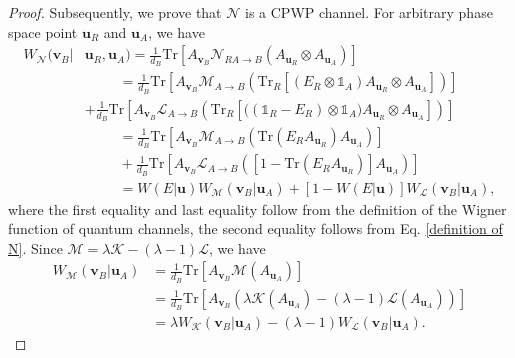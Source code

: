 \documentclass[10pt,a4paper]{amsart}
\begin{document}
\begin{proof}
	Subsequently, we prove that $\mathcal{N}$ is a CPWP channel.
	For arbitrary phase space point $\mathbf{u}_R$ and $\mathbf{u}_A$, we have
	\begin{equation}
		\begin{aligned}
			W_{\mathcal{N}}(\mathbf{v}_B|&\mathbf{u}_R,\mathbf{u}_A) = \frac{1}{d_B}\mathrm{Tr}\left[A_{\mathbf{v}_B}\mathcal{N}_{RA\rightarrow B}\left(A_{\mathbf{u}_R}\otimes A_{\mathbf{u}_A}\right)\right] \\ &~~~~~~~~~~~= \frac{1}{d_B}\mathrm{Tr}\left[A_{\mathbf{v}_B}\mathcal{M}_{A\rightarrow B}\left(\mathrm{Tr}_R\left[(E_R\otimes\mathds{1}_A)A_{\mathbf{u}_R}\otimes A_{\mathbf{u}_A}\right]\right)\right] \\ &+ \frac{1}{d_B}\mathrm{Tr}\left[A_{\mathbf{v}_B}\mathcal{L}_{A\rightarrow B}\left(\mathrm{Tr}_R\left[\bigl((\mathds{1}_R-E_R)\otimes\mathds{1}_A\bigr)A_{\mathbf{u}_R}\otimes A_{\mathbf{u}_A}\right]\right)\right] \\ &~~~~~~~~~~~= \frac{1}{d_B}\mathrm{Tr}\left[A_{\mathbf{v}_B}\mathcal{M}_{A\rightarrow B}\left(\mathrm{Tr}(E_RA_{\mathbf{u}_R})A_{\mathbf{u}_A}\right)\right] \\ &~~~~~~~~~~~+ \frac{1}{d_B}\mathrm{Tr}\left[A_{\mathbf{v}_B}\mathcal{L}_{A\rightarrow B}\left([1-\mathrm{Tr}(E_RA_{\mathbf{u}_R})]A_{\mathbf{u}_A}\right)\right] \\ &~~~~~~~~~~~= W(E|\mathbf{u}) W_{\mathcal{M}}(\mathbf{v}_B|\mathbf{u}_A) + [1-W(E|\mathbf{u})]W_{\mathcal{L}}(\mathbf{v}_B|\mathbf{u}_A),
		\end{aligned}
	\end{equation}
	where the first equality and last equality follow from the definition of the Wigner function of quantum channels, the second equality follows from Eq. \eqref{definition of N}.
	Since $\mathcal{M} = \lambda \mathcal{K} - (\lambda-1)\mathcal{L}$, we have 
	\begin{equation}
		\begin{aligned}
			W_{\mathcal{M}}(\mathbf{v}_B|\mathbf{u}_A) &= \frac{1}{d_B}\mathrm{Tr}\left[A_{\mathbf{v}_B}\mathcal{M}(A_{\mathbf{u}_A})\right] \\ &= \frac{1}{d_B}\mathrm{Tr}\left[A_{\mathbf{v}_B}\left(\lambda \mathcal{K}(A_{\mathbf{u}_A}) - (\lambda-1)\mathcal{L} (A_{\mathbf{u}_A})\right)\right] \\ &= \lambda W_{\mathcal{K}}(\mathbf{v}_B|\mathbf{u}_A)- (\lambda-1)W_{\mathcal{L}}(\mathbf{v}_B|\mathbf{u}_A).
		\end{aligned}
	\end{equation}

\end{proof}
\end{document}
